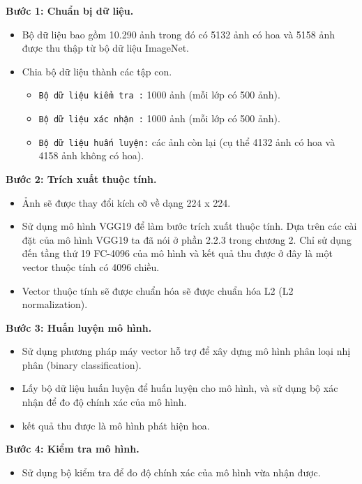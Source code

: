 \documentclass[12pt]{report}
\begin{document}
		\textbf{Bước 1: Chuẩn bị dữ liệu.} 
		\begin{itemize}
			\item Bộ dữ liệu bao gồm 10.290 ảnh trong đó có 5132 ảnh có hoa và 5158 ảnh được thu thập từ bộ dữ liệu ImageNet.
			\item Chia bộ dữ liệu thành các tập con.
			      \begin{itemize}
			      	\item \texttt{Bộ dữ liệu kiểm tra :} 1000 ảnh (mỗi lớp có 500 ảnh).
			      	\item \texttt{Bộ dữ liệu xác nhận :} 1000 ảnh (mỗi lớp có 500 ảnh).
			      	\item \texttt{Bộ dữ liệu huấn luyện:} các ảnh còn lại (cụ thể 4132 ảnh có hoa và 4158 ảnh không có hoa).
			      \end{itemize}
		\end{itemize}
														
		\textbf{Bước 2: Trích xuất thuộc tính.} 
		\begin{itemize}
			\item Ảnh sẽ được thay đổi kích cỡ về dạng 224 x 224.
			\item Sử dụng mô hình VGG19 \cite{cia_vgg19} để làm bước trích xuất thuộc tính. Dựa trên các cài đặt của mô hình VGG19 \cite{cia_vgg19} ta đã nói ở phần 2.2.3 trong chương 2. Chỉ sử dụng đến tầng thứ 19 FC-4096 của mô hình và kết quả thu được ở đây là một vector thuộc tính có 4096 chiều.
			\item Vector thuộc tính sẽ được chuẩn hóa sẽ được chuẩn hóa L2 (L2 normalization).
		\end{itemize}
										
		\textbf{Bước 3: Huấn luyện mô hình.} 
		\begin{itemize}
			\item Sử dụng phương pháp máy vector hỗ trợ để xây dựng mô hình phân loại nhị phân (binary classification). 
			\item Lấy bộ dữ liệu huấn luyện để huấn luyện cho mô hình, và sử dụng bộ xác nhận để đo độ chính xác của mô hình.
			\item kết quả thu được là mô hình phát hiện hoa.
			      			      			      			      			      
		\end{itemize}
										
		\textbf{Bước 4: Kiểm tra mô hình.} 
		\begin{itemize}
			\item Sử dụng bộ kiểm tra để đo độ chính xác của mô hình vừa nhận được.
		\end{itemize}
										
\end{document}
